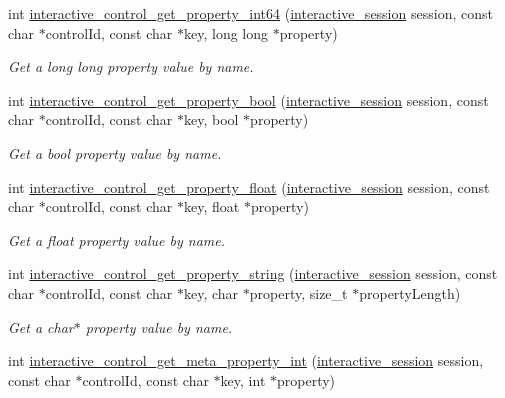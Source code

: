 \begin{DoxyCompactItemize}
int \mbox{\hyperlink{group___interactivity_ga86a32e27120b233fa435818f470b533f}{interactive\+\_\+control\+\_\+get\+\_\+property\+\_\+int64}} (\mbox{\hyperlink{group___interactivity_ga6d8819d38b8dc8994a2299cf22a65a31}{interactive\+\_\+session}} session, const char $\ast$control\+Id, const char $\ast$key, long long $\ast$property)
\begin{DoxyCompactList}\small\item\em Get a {\ttfamily long long} property value by name. \end{DoxyCompactList}\item 
int \mbox{\hyperlink{group___interactivity_gab58f1263b7769ff3b6ceb3ffab559a41}{interactive\+\_\+control\+\_\+get\+\_\+property\+\_\+bool}} (\mbox{\hyperlink{group___interactivity_ga6d8819d38b8dc8994a2299cf22a65a31}{interactive\+\_\+session}} session, const char $\ast$control\+Id, const char $\ast$key, bool $\ast$property)
\begin{DoxyCompactList}\small\item\em Get a {\ttfamily bool} property value by name. \end{DoxyCompactList}\item 
int \mbox{\hyperlink{group___interactivity_gab50af35e6041bdc529eb8967f3c063d0}{interactive\+\_\+control\+\_\+get\+\_\+property\+\_\+float}} (\mbox{\hyperlink{group___interactivity_ga6d8819d38b8dc8994a2299cf22a65a31}{interactive\+\_\+session}} session, const char $\ast$control\+Id, const char $\ast$key, float $\ast$property)
\begin{DoxyCompactList}\small\item\em Get a {\ttfamily float} property value by name. \end{DoxyCompactList}\item 
int \mbox{\hyperlink{group___interactivity_gae13de2f8b4329a0e891d43b015e91d92}{interactive\+\_\+control\+\_\+get\+\_\+property\+\_\+string}} (\mbox{\hyperlink{group___interactivity_ga6d8819d38b8dc8994a2299cf22a65a31}{interactive\+\_\+session}} session, const char $\ast$control\+Id, const char $\ast$key, char $\ast$property, size\+\_\+t $\ast$property\+Length)
\begin{DoxyCompactList}\small\item\em Get a {\ttfamily char$\ast$} property value by name. \end{DoxyCompactList}\item 
int \mbox{\hyperlink{group___interactivity_ga5c0a82e73aa86d78d64dcd2e899def55}{interactive\+\_\+control\+\_\+get\+\_\+meta\+\_\+property\+\_\+int}} (\mbox{\hyperlink{group___interactivity_ga6d8819d38b8dc8994a2299cf22a65a31}{interactive\+\_\+session}} session, const char $\ast$control\+Id, const char $\ast$key, int $\ast$property)

\end{DoxyCompactItemize}
